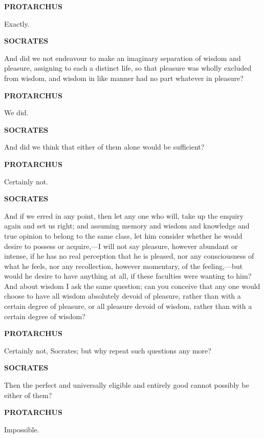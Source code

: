 \documentclass[11pt,letter]{article}
\begin{document}
\par \textbf{PROTARCHUS}
\par   Exactly.

\par \textbf{SOCRATES}
\par   And did we not endeavour to make an imaginary separation of wisdom and pleasure, assigning to each a distinct life, so that pleasure was wholly excluded from wisdom, and wisdom in like manner had no part whatever in pleasure?

\par \textbf{PROTARCHUS}
\par   We did.

\par \textbf{SOCRATES}
\par   And did we think that either of them alone would be sufficient?

\par \textbf{PROTARCHUS}
\par   Certainly not.

\par \textbf{SOCRATES}
\par   And if we erred in any point, then let any one who will, take up the enquiry again and set us right; and assuming memory and wisdom and knowledge and true opinion to belong to the same class, let him consider whether he would desire to possess or acquire,—I will not say pleasure, however abundant or intense, if he has no real perception that he is pleased, nor any consciousness of what he feels, nor any recollection, however momentary, of the feeling,—but would he desire to have anything at all, if these faculties were wanting to him? And about wisdom I ask the same question; can you conceive that any one would choose to have all wisdom absolutely devoid of pleasure, rather than with a certain degree of pleasure, or all pleasure devoid of wisdom, rather than with a certain degree of wisdom?

\par \textbf{PROTARCHUS}
\par   Certainly not, Socrates; but why repeat such questions any more?

\par \textbf{SOCRATES}
\par   Then the perfect and universally eligible and entirely good cannot possibly be either of them?

\par \textbf{PROTARCHUS}
\par   Impossible.
\end{document}
